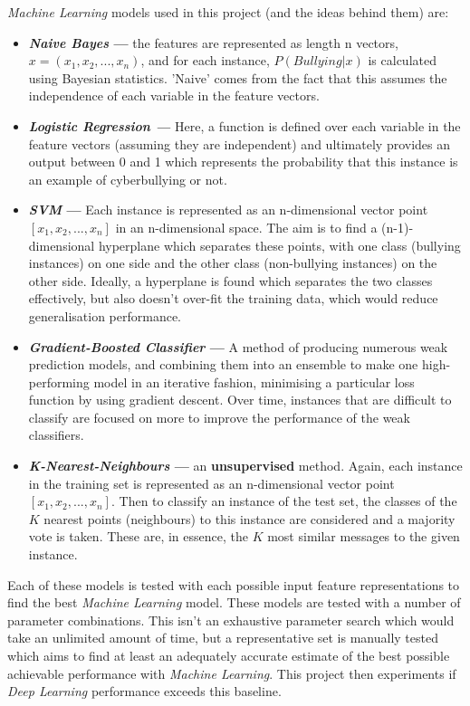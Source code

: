 \documentclass[12pt,a4paper]{article}
\begin{document}
\textit{Machine Learning} models used in this project (and the ideas behind them) are:
\begin{itemize}
	\item \textbf{\textit{Naive Bayes} ---} the features are represented as length n vectors, $x=(x_1,x_2,...,x_n)$, and for each instance, $P(Bullying | x)$ is calculated using Bayesian statistics. 'Naive' comes from the fact that this assumes the independence of each variable in the feature vectors.
	\item \textbf\textit{{Logistic Regression} ---} Here, a function is defined over each variable in the feature vectors (assuming they are independent) and ultimately provides an output between 0 and 1 which represents the probability that this instance is an example of cyberbullying or not. 
	\item \textbf{\textit{SVM} ---} Each instance is represented as an n-dimensional vector point $[x_1,x_2,...,x_n]$ in an n-dimensional space. The aim is to find a (n-1)-dimensional hyperplane which separates these points, with one class (bullying instances) on one side and the other class (non-bullying instances) on the other side. Ideally, a hyperplane is found which separates the two classes effectively, but also doesn't over-fit the training data, which would reduce generalisation performance.
	\item \textbf{\textit{Gradient-Boosted Classifier} --- } A method of producing numerous weak prediction models, and combining them into an ensemble to make one high-performing model in an iterative fashion, minimising a particular loss function by using gradient descent. Over time, instances that are difficult to classify are focused on more to improve the performance of the weak classifiers.
	\item \textbf{\textit{K-Nearest-Neighbours} ---} an \textbf{unsupervised} method. Again, each instance in the training set is represented as an n-dimensional vector point $[x_1,x_2,...,x_n]$. Then to classify an instance of the test set, the classes of the $K$ nearest points (neighbours) to this instance are considered and a majority vote is taken. These are, in essence, the $K$ most similar messages to the given instance.
\end{itemize}
Each of these models is tested with each possible input feature representations to find the best \textit{Machine Learning} model. These models are tested with a number of parameter combinations. This isn't an exhaustive parameter search which would take an unlimited amount of time, but a representative set is manually tested which aims to find at least an adequately accurate estimate of the best possible achievable performance with \textit{Machine Learning}. This project then experiments if \textit{Deep Learning} performance exceeds this baseline. 
\end{document}

